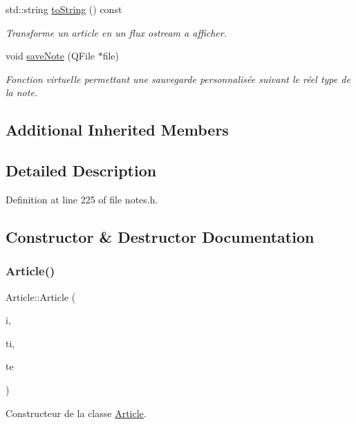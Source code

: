 \begin{DoxyCompactItemize}
std\+::string \hyperlink{class_article_ae40d268ecffbaaa549968a81ea609ba4}{to\+String} () const
\begin{DoxyCompactList}\small\item\em Transforme un article en un flux ostream a afficher. \end{DoxyCompactList}\item 
void \hyperlink{class_article_a83c6688e4886b871938b9dca34e78041}{save\+Note} (Q\+File $\ast$file)
\begin{DoxyCompactList}\small\item\em Fonction virtuelle permettant une sauvegarde personnalisée suivant le réel type de la note. \end{DoxyCompactList}\end{DoxyCompactItemize}
\subsection*{Additional Inherited Members}


\subsection{Detailed Description}


Definition at line 225 of file notes.\+h.



\subsection{Constructor \& Destructor Documentation}
\mbox{\label{class_article_af3f6b98ba3cc46aaa5625a17266eb67f}} 
\subsubsection{\texorpdfstring{Article()}{Article()}}
{\footnotesize\ttfamily Article\+::\+Article (\begin{DoxyParamCaption}\item[{const Q\+String \&}]{i,  }\item[{const Q\+String \&}]{ti,  }\item[{const Q\+String \&}]{te }\end{DoxyParamCaption})}



Constructeur de la classe \hyperlink{class_article}{Article}. 

